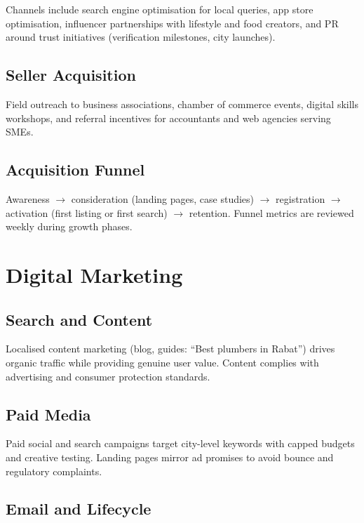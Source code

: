 Channels include search engine optimisation for local queries, app store optimisation, influencer partnerships with lifestyle and food creators, and PR around trust initiatives (verification milestones, city launches).

\subsection{Seller Acquisition}

Field outreach to business associations, chamber of commerce events, digital skills workshops, and referral incentives for accountants and web agencies serving SMEs.

\subsection{Acquisition Funnel}

Awareness $\rightarrow$ consideration (landing pages, case studies) $\rightarrow$ registration $\rightarrow$ activation (first listing or first search) $\rightarrow$ retention. Funnel metrics are reviewed weekly during growth phases.


\section{Digital Marketing}

\subsection{Search and Content}

Localised content marketing (blog, guides: ``Best plumbers in Rabat'') drives organic traffic while providing genuine user value. Content complies with advertising and consumer protection standards.

\subsection{Paid Media}

Paid social and search campaigns target city-level keywords with capped budgets and creative testing. Landing pages mirror ad promises to avoid bounce and regulatory complaints.

\subsection{Email and Lifecycle}

